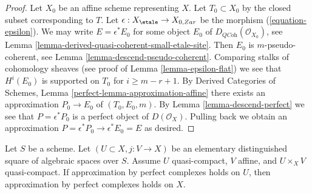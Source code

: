 \begin{proof}
Let $X_0$ be an affine scheme representing $X$. Let $T_0 \subset X_0$
by the closed subset corresponding to $T$. Let
$\epsilon : X_\etale \to X_{0, Zar}$ be the morphism
(\ref{equation-epsilon}). We may write $E = \epsilon^*E_0$ for some object
$E_0$ of $D_{\textit{QCoh}}(\mathcal{O}_{X_0})$, see
Lemma \ref{lemma-derived-quasi-coherent-small-etale-site}.
Then $E_0$ is $m$-pseudo-coherent, see
Lemma \ref{lemma-descend-pseudo-coherent}.
Comparing stalks of cohomology sheaves (see proof of
Lemma \ref{lemma-epsilon-flat})
we see that $H^i(E_0)$ is supported on $T_0$ for $i \geq m - r + 1$. By
Derived Categories of Schemes, Lemma \ref{perfect-lemma-approximation-affine}
there exists an approximation $P_0 \to E_0$ of
$(T_0, E_0, m)$. By Lemma \ref{lemma-descend-perfect}
we see that $P = \epsilon^*P_0$ is a perfect object of $D(\mathcal{O}_X)$.
Pulling back we obtain an approximation
$P = \epsilon^*P_0 \to \epsilon^*E_0 = E$ as desired.
\end{proof}

\begin{lemma}
\label{lemma-induction-step}
Let $S$ be a scheme. Let $(U \subset X, j : V \to X)$ be an
elementary distinguished square of algebraic spaces over $S$.
Assume $U$ quasi-compact, $V$ affine, and $U \times_X V$ quasi-compact.
If approximation by perfect complexes holds on $U$,
then approximation by perfect complexes holds on $X$.
\end{lemma}

